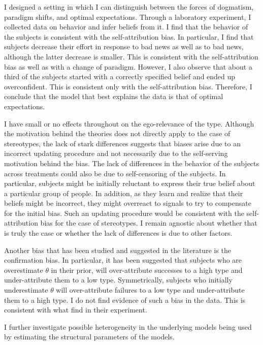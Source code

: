 \documentclass[
  12pt,
]{article}
\begin{document}
I designed a setting in which I can distinguish between the forces of
dogmatism, paradigm shifts, and optimal expectations. Through a
laboratory experiment, I collected data on behavior and infer beliefs
from it. I find that the behavior of the subjects is consistent with the
self-attribution bias. In particular, I find that subjects decrease
their effort in response to bad news as well as to bad news, although
the latter decrease is smaller. This is consistent with the
self-attribution bias as well as with a change of paradigm. However, I
also observe that about a third of the subjects started with a correctly
specified belief and ended up overconfident. This is consistent only
with the self-attribution bias. Therefore, I conclude that the model
that best explains the data is that of optimal expectations.

I have small or no effects throughout on the ego-relevance of the type.
Although the motivation behind the theories does not directly apply to
the case of stereotypes, the lack of stark differences suggests that
biases arise due to an incorrect updating procedure and not necessarily
due to the self-serving motivation behind the bias. The lack of
differences in the behavior of the subjects across treatments could also
be due to self-censoring of the subjects. In particular, subjects might
be initially reluctant to express their true belief about a particular
group of people. In addition, as they learn and realize that their
beliefs might be incorrect, they might overreact to signals to try to
compensate for the initial bias. Such an updating procedure would be
consistent with the self-attribution bias for the case of stereotypes. I
remain agnostic about whether that is truly the case or whether the lack
of differences is due to other factors.

Another bias that has been studied and suggested in the literature is
the confirmation bias. In particular, it has been suggested that
subjects who are overestimate \(\theta\) in their prior, will
over-attribute successes to a high type and under-attribute them to a
low type. Symmetrically, subjects who initially underestimate \(\theta\)
will over-attribute failures to a low type and under-attribute them to a
high type. I do not find evidence of such a bias in the data. This is
consistent with what \citet{Mobius2022} find in their experiment.

I further investigate possible heterogeneity in the underlying models
being used by estimating the structural parameters of the models.
\end{document}
